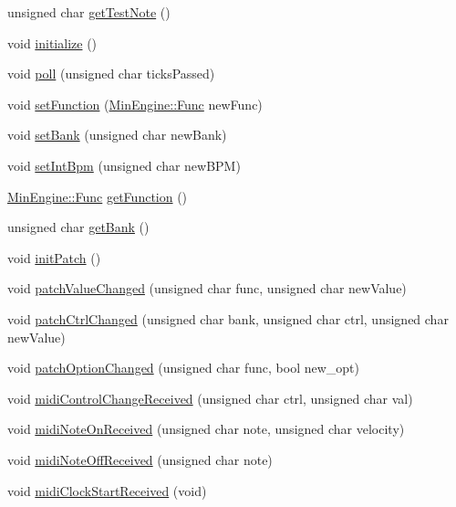 \begin{DoxyCompactItemize}
\item 
unsigned char \hyperlink{class_min_engine_a461861aff0eb8271558c9c20bc040b56}{get\+Test\+Note} ()
\item 
void \hyperlink{class_min_engine_ae59276976966cfd710288c1bbf1ea0cf}{initialize} ()
\item 
void \hyperlink{class_min_engine_af0b91eca44954cb677808c3d24659596}{poll} (unsigned char ticks\+Passed)
\item 
void \hyperlink{class_min_engine_a33949965a982b0d8e690ebc781e33977}{set\+Function} (\hyperlink{class_min_engine_a30e1f14df71447889a8a5060cff6fbd8}{Min\+Engine\+::\+Func} new\+Func)
\item 
void \hyperlink{class_min_engine_ac76abe71fbd84b163b68fc7b12fb1a26}{set\+Bank} (unsigned char new\+Bank)
\item 
void \hyperlink{class_min_engine_a7ef07f3911096d861e030cccfd8899b5}{set\+Int\+Bpm} (unsigned char new\+B\+PM)
\item 
\hyperlink{class_min_engine_a30e1f14df71447889a8a5060cff6fbd8}{Min\+Engine\+::\+Func} \hyperlink{class_min_engine_a36831a348bb8157f2cc3a4720d92434e}{get\+Function} ()
\item 
unsigned char \hyperlink{class_min_engine_ae9224dca462d7a6233fb7c22210cc8a8}{get\+Bank} ()
\item 
void \hyperlink{class_min_engine_afd7005953daedf58d4332627e1592c07}{init\+Patch} ()
\item 
void \hyperlink{class_min_engine_a229d4b913277a48909bf1aa01176ae1f}{patch\+Value\+Changed} (unsigned char func, unsigned char new\+Value)
\item 
void \hyperlink{class_min_engine_ad26e5e985eb56946ae93dc3274874229}{patch\+Ctrl\+Changed} (unsigned char bank, unsigned char ctrl, unsigned char new\+Value)
\item 
void \hyperlink{class_min_engine_aff5a85aae7d6f6e5edd571c73c071871}{patch\+Option\+Changed} (unsigned char func, bool new\+\_\+opt)
\item 
void \hyperlink{class_min_engine_ad7404def0db3926e77c8828cab13cca9}{midi\+Control\+Change\+Received} (unsigned char ctrl, unsigned char val)
\item 
void \hyperlink{class_min_engine_a108d70cfac8c363fbf6445f679dcf4d5}{midi\+Note\+On\+Received} (unsigned char note, unsigned char velocity)
\item 
void \hyperlink{class_min_engine_aaab036105fa3dce51cc8c8345f2edcfe}{midi\+Note\+Off\+Received} (unsigned char note)
\item 
void \hyperlink{class_min_engine_ad0378027f052b780481611fa4335b68d}{midi\+Clock\+Start\+Received} (void)

\end{DoxyCompactItemize}
